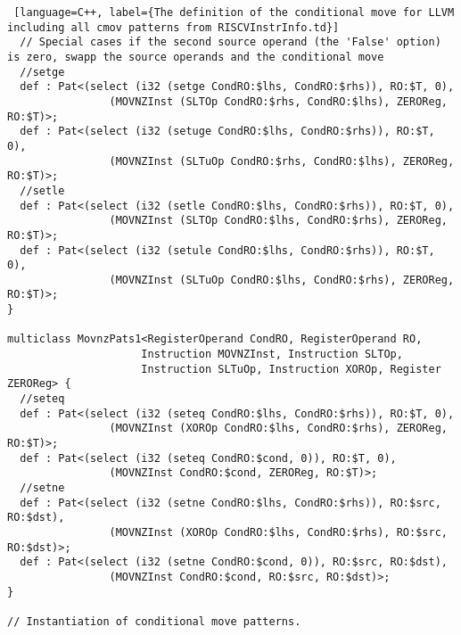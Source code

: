 \documentclass[12pt,twoside,notitlepage]{report}
\begin{document}
\begin{lstlisting} [language=C++, label={The definition of the conditional move for LLVM including all cmov patterns from RISCVInstrInfo.td}]
  // Special cases if the second source operand (the 'False' option) is zero, swapp the source operands and the conditional move
  //setge
  def : Pat<(select (i32 (setge CondRO:$lhs, CondRO:$rhs)), RO:$T, 0),
                (MOVNZInst (SLTOp CondRO:$rhs, CondRO:$lhs), ZEROReg, RO:$T)>;
  def : Pat<(select (i32 (setuge CondRO:$lhs, CondRO:$rhs)), RO:$T, 0),
                (MOVNZInst (SLTuOp CondRO:$rhs, CondRO:$lhs), ZEROReg, RO:$T)>;
  //setle
  def : Pat<(select (i32 (setle CondRO:$lhs, CondRO:$rhs)), RO:$T, 0),
                (MOVNZInst (SLTOp CondRO:$lhs, CondRO:$rhs), ZEROReg, RO:$T)>;
  def : Pat<(select (i32 (setule CondRO:$lhs, CondRO:$rhs)), RO:$T, 0),
                (MOVNZInst (SLTuOp CondRO:$lhs, CondRO:$rhs), ZEROReg, RO:$T)>;  			
}

multiclass MovnzPats1<RegisterOperand CondRO, RegisterOperand RO,
                     Instruction MOVNZInst, Instruction SLTOp,
                     Instruction SLTuOp, Instruction XOROp, Register ZEROReg> {
  //seteq
  def : Pat<(select (i32 (seteq CondRO:$lhs, CondRO:$rhs)), RO:$T, 0),
				(MOVNZInst (XOROp CondRO:$lhs, CondRO:$rhs), ZEROReg, RO:$T)>;
  def : Pat<(select (i32 (seteq CondRO:$cond, 0)), RO:$T, 0),
				(MOVNZInst CondRO:$cond, ZEROReg, RO:$T)>;
  //setne              
  def : Pat<(select (i32 (setne CondRO:$lhs, CondRO:$rhs)), RO:$src, RO:$dst),
				(MOVNZInst (XOROp CondRO:$lhs, CondRO:$rhs), RO:$src, RO:$dst)>;
  def : Pat<(select (i32 (setne CondRO:$cond, 0)), RO:$src, RO:$dst),
				(MOVNZInst CondRO:$cond, RO:$src, RO:$dst)>;
}

// Instantiation of conditional move patterns.


\end{lstlisting}
\end{document}
